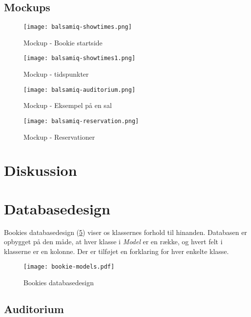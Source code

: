\subsection{Mockups}

\begin{figure}[h]
  \centering
  \texttt{[image: balsamiq-showtimes.png]}
  \caption{Mockup - Bookie startside}
  \label{mockup: balsamiq-showtimes}
\end{figure}

\begin{figure}[h]
  \centering
  \texttt{[image: balsamiq-showtimes1.png]}
  \caption{Mockup - tidspunkter}
  \label{mockup: balsamiq-showtimes1}
\end{figure}

\begin{figure}[h]
  \centering
  \texttt{[image: balsamiq-auditorium.png]}
  \caption{Mockup - Eksempel på en sal}
  \label{mockup: balsamiq-auditorium}
\end{figure}

\begin{figure}[h]
  \centering
  \texttt{[image: balsamiq-reservation.png]}
  \caption{Mockup - Reservationer}
  \label{mockup: balsamiq-reservation}
\end{figure}

\section{Diskussion}

\section{Databasedesign}

Bookies databasedesign (\ref{class-diagram: bookie-models}) viser os klassernes forhold til hinanden. Databasen er opbygget på den måde, at hver klasse i \textit{Model} er en række, og hvert felt i klasserne er en kolonne. Der er tilføjet en forklaring for hver enkelte klasse.

\begin{figure}[h]
  \centering
  \texttt{[image: bookie-models.pdf]}
  \caption{Bookies databasedesign}
  \label{class-diagram: bookie-models}
\end{figure}

\subsection{Auditorium}

